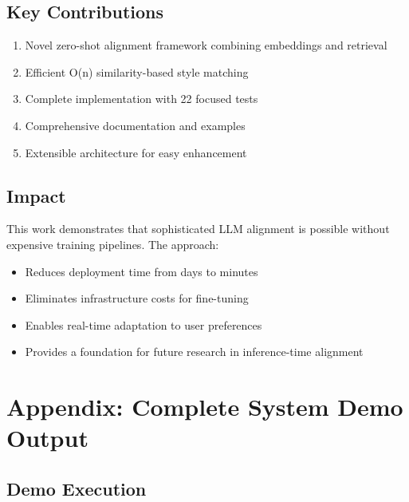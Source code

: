 \documentclass[11pt,a4paper]{article}
\begin{document}
\subsection{Key Contributions}

\begin{enumerate}
    \item Novel zero-shot alignment framework combining embeddings and retrieval
    \item Efficient O(n) similarity-based style matching
    \item Complete implementation with 22 focused tests
    \item Comprehensive documentation and examples
    \item Extensible architecture for easy enhancement
\end{enumerate}

\subsection{Impact}

This work demonstrates that sophisticated LLM alignment is possible without expensive training pipelines. The approach:
\begin{itemize}
    \item Reduces deployment time from days to minutes
    \item Eliminates infrastructure costs for fine-tuning
    \item Enables real-time adaptation to user preferences
    \item Provides a foundation for future research in inference-time alignment
\end{itemize}

\section*{Appendix: Complete System Demo Output}

\subsection*{Demo Execution}
\end{document}
